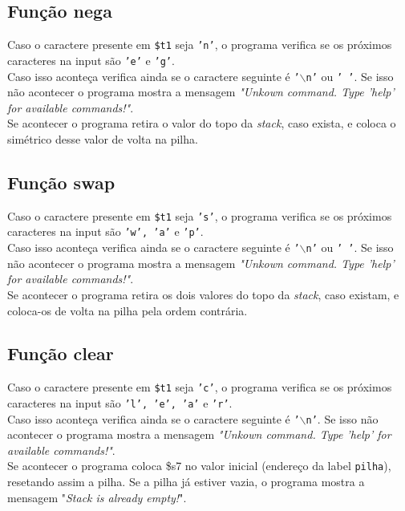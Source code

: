 \documentclass[12pt, a4paper]{article}
\begin{document}
        \subsection{Função nega}
        Caso o caractere presente em \texttt{\$t1} seja \texttt{'n'}, o programa verifica se os próximos caracteres na input são \texttt{'e'} e \texttt{'g'}.\\
        Caso isso aconteça verifica ainda se o caractere seguinte é \texttt{'$\backslash$n'} ou \texttt{' '}. Se isso não acontecer o programa mostra a mensagem \textit{"Unkown command. Type 'help' for available commands!"}.\\
        Se acontecer o programa retira o valor do topo da \textit{stack}, caso exista, e coloca o simétrico desse valor de volta na pilha.
        
        \subsection{Função swap}
        Caso o caractere presente em \texttt{\$t1} seja \texttt{'s'}, o programa verifica se os próximos caracteres na input são \texttt{'w', 'a'} e \texttt{'p'}.\\
        Caso isso aconteça verifica ainda se o caractere seguinte é \texttt{'$\backslash$n'} ou \texttt{' '}. Se isso não acontecer o programa mostra a mensagem \textit{"Unkown command. Type 'help' for available commands!"}.\\
        Se acontecer o programa retira os dois valores do topo da \textit{stack}, caso existam, e coloca-os de volta na pilha pela ordem contrária.
        
        \subsection{Função clear}
        Caso o caractere presente em \texttt{\$t1} seja \texttt{'c'}, o programa verifica se os próximos caracteres na input são \texttt{'l', 'e', 'a'} e \texttt{'r'}.\\
        Caso isso aconteça verifica ainda se o caractere seguinte é \texttt{'$\backslash$n'}. Se isso não acontecer o programa mostra a mensagem \textit{"Unkown command. Type 'help' for available commands!"}.\\
        Se acontecer o programa coloca \$s7 no valor inicial (endereço da label \texttt{pilha}), resetando assim a pilha.
        Se a pilha já estiver vazia, o programa mostra a mensagem "\textit{Stack is already empty!}".
        
\end{document}
